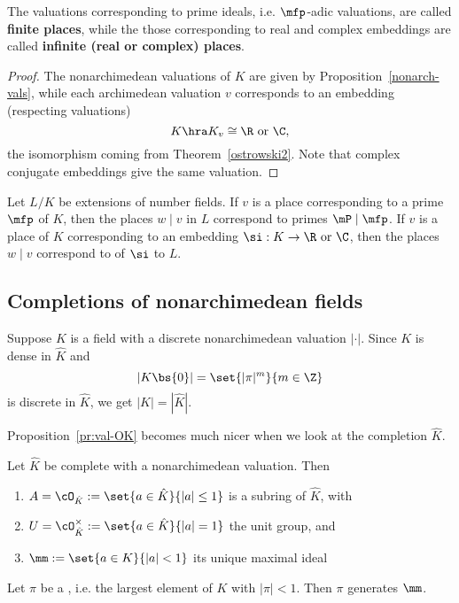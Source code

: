 The valuations corresponding to prime ideals, i.e. $\mfp$-adic valuations, are called \textbf{finite places}, while the those corresponding to real and complex embeddings are called \textbf{infinite (real or complex) places}.
\begin{proof}
The nonarchimedean valuations of $K$ are given by Proposition~\ref{nonarch-vals}, while each archimedean valuation $v$ corresponds to an embedding (respecting valuations)
\[
K\hra K_v\cong \R\text{ or }\C,
\]
the isomorphism coming from Theorem~\ref{ostrowski2}. Note that complex conjugate embeddings give the same valuation.
\end{proof}
\begin{cor}
Let $L/K$ be extensions of number fields. If $v$ is a place corresponding to a prime $\mfp$ of $K$, then the places $w\mid v$ in $L$ correspond to primes $\mP\mid \mfp$. If $v$ is a place of $K$ corresponding to an embedding $\si:K\to \R\text{ or }\C$, then the places $w\mid v$ correspond to of $\si$ to $L$.
\end{cor}
\subsection{Completions of nonarchimedean fields}
Suppose $K$ is a field with a discrete nonarchimedean valuation $|\cdot|$. Since $K$ is dense in $\hat K$ and 
\[|K\bs\{0\}|=\set{|\pi|^m}{m\in \Z}\]
is discrete in $\hat K$, we get $|K|=|\hat K|$.

Proposition~\ref{pr:val-OK} becomes much nicer when we look at the completion $\hat K$.
\begin{pr}
Let $\hat K$ be complete with a nonarchimedean valuation. Then
\begin{enumerate}
\item
$A = \cO_{\hat K}:=\set{a\in \hat K}{|a|\le1}$ is a subring of $\hat K$, with 
\item
$U = \cO_{\hat K}^{\times}:=\set{a\in \hat K}{|a|=1}$ the unit group, and 
\item
$\mm:=\set{a\in K}{|a|<1}$ its unique maximal ideal
\end{enumerate}
Let $\pi$ be a , i.e. the largest element of $K$ with $|\pi|<1$. %
Then $\pi$ generates $\mm$.
\end{pr}

